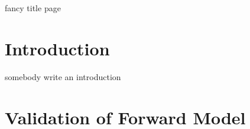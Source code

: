 \documentclass[11pt, a4paper]{report}
\begin{document}
\begin{titlepage}
\centering
{fancy title page}
\end{titlepage}






\section{Introduction}

somebody write an introduction





\section{Validation of Forward Model}
\end{document}

